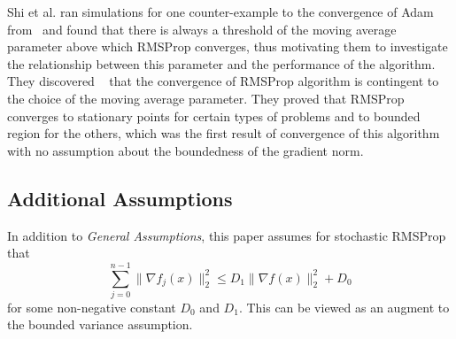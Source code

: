 \documentclass{article}
\begin{document}
Shi et al. ran simulations for one counter-example to the convergence of Adam from~\cite{https://doi.org/10.48550/arxiv.1904.09237}  and found that there is always a threshold of the moving average parameter above which
RMSProp converges, thus motivating them to investigate the relationship between this parameter and the performance of the algorithm. They discovered ~\cite{tieleman2012lecture} that the convergence of RMSProp algorithm is
contingent to the choice of the moving average parameter. They proved that RMSProp converges to stationary points for certain types of problems and to bounded region for the others, which was the first result of convergence
of this algorithm with no assumption about the boundedness of the gradient norm.

\subsection{Additional Assumptions}
In addition to \textit{General Assumptions}, this paper assumes for stochastic RMSProp that 
\begin{equation}
\label{eq51}
\sum_{j = 0}^{n - 1} \|\nabla f_j(x)\|_2^2 \leq D_1 \|\nabla f(x)\|_2^2 + D_0
\end{equation}
for some non-negative constant $D_0$ and $D_1$. This can be viewed as an augment to the bounded variance assumption.
\end{document}
